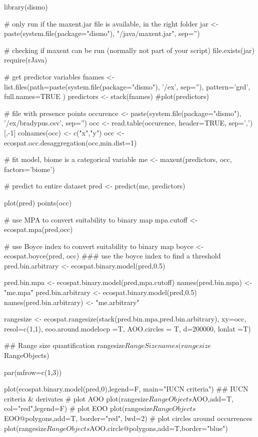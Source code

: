 \documentclass[a4paper]{book}
\begin{document}
\begin{Examples}
\begin{ExampleCode}
 library(dismo)


# only run if the maxent.jar file is available, in the right folder
jar <- paste(system.file(package="dismo"), "/java/maxent.jar", sep='')

# checking if maxent can be run (normally not part of your script)
file.exists(jar)
require(rJava)

# get predictor variables
fnames <- list.files(path=paste(system.file(package="dismo"), '/ex', sep=''), 
                     pattern='grd', full.names=TRUE )
predictors <- stack(fnames)
#plot(predictors)

# file with presence points
occurence <- paste(system.file(package="dismo"), '/ex/bradypus.csv', sep='')
occ <- read.table(occurence, header=TRUE, sep=',')[,-1]
colnames(occ) <- c("x","y")
occ <- ecospat.occ.desaggregation(occ,min.dist=1)

# fit model, biome is a categorical variable
me <- maxent(predictors, occ, factors='biome')

# predict to entire dataset
pred <- predict(me, predictors) 

plot(pred)
points(occ)


# use MPA to convert suitability to binary map
mpa.cutoff <- ecospat.mpa(pred,occ)

# use Boyce index to convert suitability to binary map
boyce <- ecospat.boyce(pred,  occ)
### use the boyce index to find a threshold
pred.bin.arbitrary <- ecospat.binary.model(pred,0.5)


pred.bin.mpa <- ecospat.binary.model(pred,mpa.cutoff)
names(pred.bin.mpa) <- "me.mpa"
pred.bin.arbitrary <- ecospat.binary.model(pred,0.5)
names(pred.bin.arbitrary) <- "me.arbitrary"

rangesize <- ecospat.rangesize(stack(pred.bin.mpa,pred.bin.arbitrary),
                               xy=occ,
                               resol=c(1,1),
                               eoo.around.modelocp =T,
                               AOO.circles = T,
                               d=200000,
                               lonlat =T)


## Range size quantification
rangesize$RangeSize

names(rangesize$RangeObjects)


par(mfrow=c(1,3))

plot(ecospat.binary.model(pred,0),legend=F, main="IUCN criteria")
## IUCN criteria & derivates
# plot AOO
plot(rangesize$RangeObjects$AOO,add=T, col="red",legend=F)
# plot EOO
plot(rangesize$RangeObjects$EOO@polygons,add=T, border="red", lwd=2)
# plot circles around occurrences
plot(rangesize$RangeObjects$AOO.circle@polygons,add=T,border="blue")


\end{ExampleCode}
\end{Examples}
\end{document}
